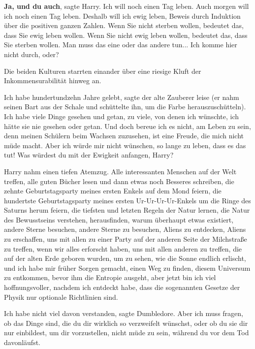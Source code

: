 \glqq{}\textbf{Ja, und du auch}\grqq{}, sagte Harry. \glqq{}Ich will noch einen
Tag leben. Auch morgen will ich noch einen Tag leben. Deshalb will ich ewig
leben, Beweis durch Induktion über die positiven ganzen Zahlen. Wenn Sie nicht
sterben wollen, bedeutet das, dass Sie ewig leben wollen. Wenn Sie nicht ewig
leben wollen, bedeutet das, dass Sie sterben wollen. Man muss das eine oder das
andere tun... Ich komme hier nicht durch, oder?\grqq{}

Die beiden Kulturen starrten einander über eine riesige Kluft der
Inkommensurabilität hinweg an.

\glqq{}Ich habe hundertundzehn Jahre gelebt\grqq{}, sagte der alte Zauberer leise
(er nahm seinen Bart aus der Schale und schüttelte ihn, um die Farbe
herauszuschütteln). \glqq{}Ich habe viele Dinge gesehen und getan, zu viele, von
denen ich wünschte, ich hätte sie nie gesehen oder getan. Und doch bereue ich es
nicht, am Leben zu sein, denn meinen Schülern beim Wachsen zuzusehen, ist eine
Freude, die mich nicht müde macht. Aber ich würde mir nicht wünschen, so lange
zu leben, dass es das tut! Was würdest du mit der Ewigkeit anfangen,
Harry?\grqq{}

Harry nahm einen tiefen Atemzug. \glqq{}Alle interessanten Menschen auf der Welt
treffen, alle guten Bücher lesen und dann etwas noch Besseres schreiben, die
zehnte Geburtstagsparty meines ersten Enkels auf dem Mond feiern, die hundertste
Geburtstagsparty meines ersten Ur-Ur-Ur-Ur-Enkels um die Ringe des Saturns herum
feiern, die tiefsten und letzten Regeln der Natur lernen, die Natur des
Bewusstseins verstehen, herausfinden, warum überhaupt etwas existiert, andere
Sterne besuchen, andere Sterne zu besuchen, Aliens zu entdecken, Aliens zu
erschaffen, uns mit allen zu einer Party auf der anderen Seite der Milchstraße
zu treffen, wenn wir alles erforscht haben, uns mit allen anderen zu treffen,
die auf der alten Erde geboren wurden, um zu sehen, wie die Sonne endlich
erlischt, und ich habe mir früher Sorgen gemacht, einen Weg zu finden, diesem
Universum zu entkommen, bevor ihm die Entropie ausgeht, aber jetzt bin ich viel
hoffnungsvoller, nachdem ich entdeckt habe, dass die sogenannten Gesetze der
Physik nur optionale Richtlinien sind.\grqq{}

\glqq{}Ich habe nicht viel davon verstanden\grqq{}, sagte Dumbledore. \glqq{}Aber
ich muss fragen, ob das Dinge sind, die du dir wirklich so verzweifelt wünschst,
oder ob du sie dir nur einbildest, um dir vorzustellen, nicht müde zu sein,
während du vor dem Tod davonläufst.\grqq{}

